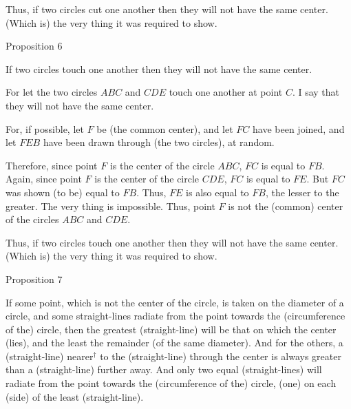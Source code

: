 Thus, if two circles cut one another then they will not have the same
center. (Which is) the very thing it was required to show.


\begin{center}
{\large Proposition 6}
\end{center}

If  two circles touch one another then they  will not have the same center.

\epsfysize=2.2in
\centerline{}

For let the two circles $ABC$ and $CDE$ touch one another at point $C$. I say that
they will not have the same center.

For, if possible, let $F$ be (the common center), and let $FC$ have been
joined, and let $FEB$ have been drawn through (the two circles), at random.

Therefore, since point $F$ is the center of the circle $ABC$, $FC$ is equal to
$FB$. Again, since point $F$ is the center of the circle $CDE$, $FC$ is
equal to $FE$. But $FC$ was shown (to be) equal to $FB$. Thus, $FE$ is
also equal to $FB$, the lesser to the greater. The very thing is impossible.
Thus, point $F$ is not the (common) center of the circles
$ABC$ and $CDE$.

Thus, if two circles touch one another then they  will not have the same center. (Which is) the very thing it was required to show.


\begin{center}
{\large Proposition 7}
\end{center}

If some point, which is not the
center of the circle, is taken on the diameter of a circle,
and some straight-lines radiate from the point towards
the (circumference of the) circle, then the greatest (straight-line) will be that on which
the center (lies), and the least the remainder (of the same diameter). And
for the others, a (straight-line) nearer$^\dag$ to the (straight-line) through the center is always
greater than a (straight-line) further away. And only two equal (straight-lines)
will radiate from the point towards the (circumference of the) circle, (one)
on each (side) of the least (straight-line).

\epsfysize=2.5in
\centerline{}

